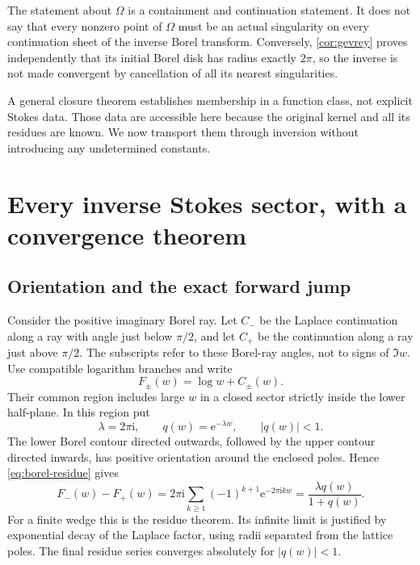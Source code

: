 \documentclass[11pt,a4paper]{article}
\theoremstyle{definition}
\numberwithin{equation}{section}
\newcommand{\ii}{\mathrm{i}}
\newcommand{\ee}{\mathrm{e}}
\begin{document}
The statement about $\Omega$ is a containment and continuation statement. It does not say that every nonzero point of $\Omega$ must be an actual singularity on every continuation sheet of the inverse Borel transform. Conversely, \cref{cor:gevrey} proves independently that its initial Borel disk has radius exactly $2\pi$, so the inverse is not made convergent by cancellation of all its nearest singularities.

A general closure theorem establishes membership in a function class, not explicit Stokes data. Those data are accessible here because the original kernel and all its residues are known. We now transport them through inversion without introducing any undetermined constants.

\section{Every inverse Stokes sector, with a convergence theorem}
\label{sec:stokes}

\subsection{Orientation and the exact forward jump}
Consider the positive imaginary Borel ray. Let $C_-$ be the Laplace continuation along a ray with angle just below $\pi/2$, and let $C_+$ be the continuation along a ray just above $\pi/2$. The subscripts refer to these Borel-ray angles, not to signs of $\Im w$. Use compatible logarithm branches and write
\[
 F_\pm(w)=\log w+C_\pm(w).
\]
Their common region includes large $w$ in a closed sector strictly inside the lower half-plane. In this region put
\begin{equation}
 \lambda=2\pi\ii,\qquad q(w)=\ee^{-\lambda w},\qquad |q(w)|<1.
 \label{eq:lambda-q}
\end{equation}
The lower Borel contour directed outwards, followed by the upper contour directed inwards, has positive orientation around the enclosed poles. Hence \eqref{eq:borel-residue} gives
\begin{equation}
 F_-(w)-F_+(w)
 =2\pi\ii\sum_{k\ge1}(-1)^{k+1}\ee^{-2\pi\ii k w}
 =\frac{\lambda q(w)}{1+q(w)}.
 \label{eq:forward-jump}
\end{equation}
For a finite wedge this is the residue theorem. Its infinite limit is justified by exponential decay of the Laplace factor, using radii separated from the lattice poles. The final residue series converges absolutely for $|q(w)|<1$.
\end{document}
